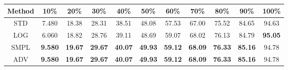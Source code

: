 \documentclass{standalone}
\begin{document}
\begin{tabular}{c|cccccccccc}
      \toprule
      Method & 10\% & 20\% & 30\% & 40\% & 50\% & 60\% & 70\% & 80\% & 90\% & 100\% \\
      \midrule
STD & 7.480 & 18.38 & 28.31 & 38.51 & 48.08 & 57.53 & 67.00 & 75.52 & 84.65 & 94.63\\
LOG & 6.060 & 18.82 & 28.76 & 39.11 & 48.69 & 59.07 & 68.02 & 76.13 & 84.79 & \textbf{95.05}\\
SMPL & \textbf{9.580} & \textbf{19.67} & \textbf{29.67} & \textbf{40.07} & \textbf{49.93} & \textbf{59.12} & \textbf{68.09} & \textbf{76.33} & \textbf{85.16} & 94.78\\
ADV & \textbf{9.580} & \textbf{19.67} & \textbf{29.67} & \textbf{40.07} & \textbf{49.93} & \textbf{59.12} & \textbf{68.09} & \textbf{76.33} & \textbf{85.16} & 94.78\\
  \bottomrule
\end{tabular}
\end{document}
